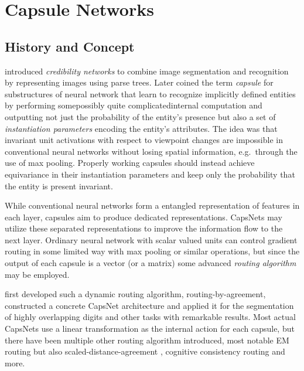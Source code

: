 
\section{Capsule Networks}
\label{sec:capsules}

\subsection{History and Concept}

\citet{parse} introduced \emph{credibility networks} to combine image segmentation and recognition by representing images using parse trees.
Later \citet{transformingauto} coined the term \emph{capsule} for substructures of neural network that learn to recognize implicitly defined entities by performing some\textemdash possibly quite complicated\textemdash internal computation and outputting not just the probability of the entity's presence but also a set of \emph{instantiation parameters} encoding the entity's attributes.
The idea was that invariant unit activations with respect to viewpoint changes are impossible in conventional neural networks without losing spatial information, e.g.\ through the use of max pooling.
Properly working capsules should instead achieve equivariance in their instantiation parameters and keep only the probability that the entity is present invariant.

While conventional neural networks form a entangled representation of features in each layer, capsules aim to produce dedicated representations.
CapsNets may utilize these separated representations to improve the information flow to the next layer.
Ordinary neural network with scalar valued units can control gradient routing in some limited way with max pooling or similar operations, but since the output of each capsule is a vector (or a matrix) some advanced \emph{routing algorithm} may be employed.

\citet{capsules} first developed such a dynamic routing algorithm, routing-by-agreement, constructed a concrete CapsNet architecture and applied it for the segmentation of highly overlapping digits and other tasks with remarkable results.
Most actual CapsNets use a linear transformation as the internal action for each capsule, but there have been multiple other routing algorithm introduced, most notable EM routing \citep{em} but also scaled-distance-agreement \citep{scaledagreement}, cognitive consistency routing \citep{cognitive} and more.

